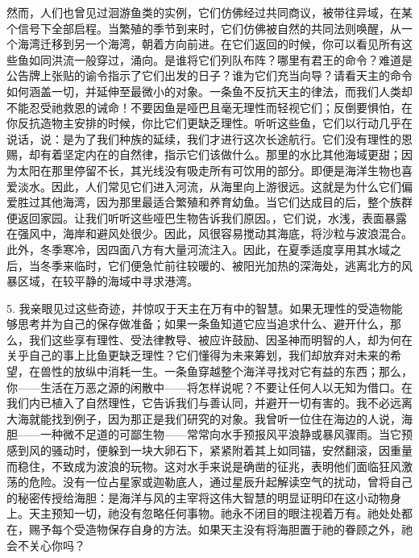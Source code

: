 然而，人们也曾见过洄游鱼类的实例，它们仿佛经过共同商议，被带往异域，在某个信号下全部启程。当繁殖的季节到来时，它们仿佛被自然的共同法则唤醒，从一个海湾迁移到另一个海湾，朝着方向前进。在它们返回的时候，你可以看见所有这些鱼如同洪流一般穿过，涌向。是谁将它们列队布阵？哪里有君王的命令？难道是公告牌上张贴的谕令指示了它们出发的日子？谁为它们充当向导？请看天主的命令如何涵盖一切，并延伸至最微小的对象。一条鱼不反抗天主的律法，而我们人类却不能忍受祂救恩的诫命！不要因鱼是哑巴且毫无理性而轻视它们；反倒要惧怕，在你反抗造物主安排的时候，你比它们更缺乏理性。听听这些鱼，它们以行动几乎在说话，说：是为了我们种族的延续，我们才进行这次长途航行。它们没有理性的恩赐，却有着坚定内在的自然律，指示它们该做什么。那里的水比其他海域更甜；因为太阳在那里停留不长，其光线没有吸走所有可饮用的部分。即便是海洋生物也喜爱淡水。因此，人们常见它们进入河流，从海里向上游很远。这就是为什么它们偏爱胜过其他海湾，因为那里最适合繁殖和养育幼鱼。当它们达成目的后，整个族群便返回家园。让我们听听这些哑巴生物告诉我们原因。，它们说，水浅，表面暴露在强风中，海岸和避风处很少。因此，风很容易搅动其海底，将沙粒与波浪混合。此外，冬季寒冷，因四面八方有大量河流注入。因此，在夏季适度享用其水域之后，当冬季来临时，它们便急忙前往较暖的、被阳光加热的深海处，逃离北方的风暴区域，在较平静的海域中寻求港湾。\par

5. 我亲眼见过这些奇迹，并惊叹于天主在万有中的智慧。如果无理性的受造物能够思考并为自己的保存做准备；如果一条鱼知道它应当追求什么、避开什么，那么，我们这些享有理性、受法律教导、被应许鼓励、因圣神而明智的人，却为何在关乎自己的事上比鱼更缺乏理性？它们懂得为未来筹划，我们却放弃对未来的希望，在兽性的放纵中消耗一生。一条鱼穿越整个海洋寻找对它有益的东西；那么，你——生活在万恶之源的闲散中——将怎样说呢？不要让任何人以无知为借口。在我们内已植入了自然理性，它告诉我们与善认同，并避开一切有害的。我不必远离大海就能找到例子，因为那正是我们研究的对象。我曾听一位住在海边的人说，海胆——一种微不足道的可鄙生物——常常向水手预报风平浪静或暴风骤雨。当它预感到风的骚动时，便躲到一块大卵石下，紧紧附着其上如同锚，安然翻滚，因重量而稳住，不致成为波浪的玩物。这对水手来说是确凿的征兆，表明他们面临狂风激荡的危险。没有一位占星家或迦勒底人，通过星辰升起解读空气的扰动，曾将自己的秘密传授给海胆：是海洋与风的主宰将这伟大智慧的明显证明印在这小动物身上。天主预知一切，祂没有忽略任何事物。祂永不闭目的眼注视着万有。祂处处都在，赐予每个受造物保存自身的方法。如果天主没有将海胆置于祂的眷顾之外，祂会不关心你吗？\par

